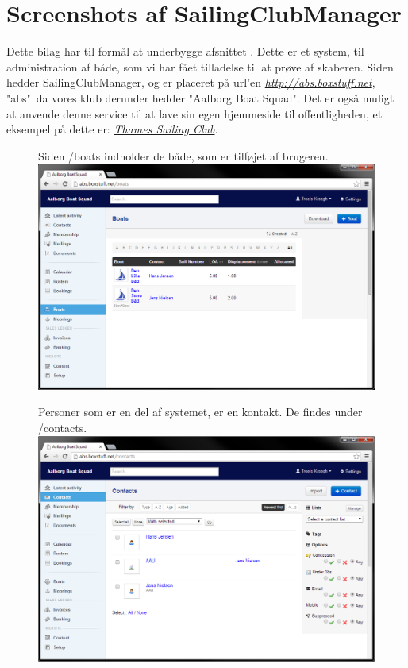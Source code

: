 \chapter{Screenshots af SailingClubManager}\label{bilag:scm}

Dette bilag har til formål at underbygge afsnittet . Dette er et system, til administration af både, som vi har fået tilladelse til at prøve af skaberen. Siden hedder SailingClubManager, og er placeret på url'en \href{http://abs.boxstuff.net}{\textit{http://abs.boxstuff.net}}, "abs"\ da vores klub derunder hedder "Aalborg Boat Squad". Det er også muligt at anvende denne service til at lave sin egen hjemmeside til offentligheden, et eksempel på dette er: \href{http://www.thamessailingclub.co.uk/}{\textit{Thames Sailing Club}}.

\begin{figure}
	Siden /boats indholder de både, som er tilføjet af brugeren. \newline
	\includegraphics[scale=0.5]{images/teknologi/_Boats}
\end{figure}

\begin{figure}
	Personer som er en del af systemet, er en kontakt. De findes under /contacts.\newline
	\includegraphics[scale=0.5]{images/teknologi/_Contacts}
\end{figure}

